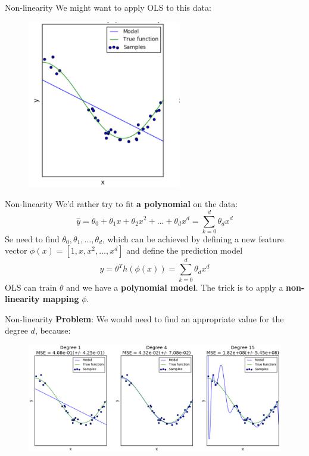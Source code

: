 \documentclass{beamer}
\newcommand{\1}[1]{\mathbbm{1}\left[#1\right]}
\newcommand{\yhat}{\hat{y}}
\begin{document}
\begin{frame}{Non-linearity}
We might want to apply OLS to this data:
\begin{figure}
\centering
\includegraphics[width=0.6\textwidth]{images/underfitting.png}
\end{figure}
\end{frame}

\begin{frame}{Non-linearity}
We'd rather try to fit \textbf{a polynomial} on the data:
\begin{equation*}
\yhat = \theta_0 + \theta_1 x + \theta_2 x^2 + \dots + \theta_d x^d = \sum_{k = 0}^d \theta_d x^d 
\end{equation*}
\pause
\vfill
Se need to find $\theta_0, \theta_1, \dots, \theta_d$, which can be achieved by defining a new feature vector $\phi(x) = [1, x, x^2, \dots, x^d]$ and define the prediction model
\begin{equation*}
\yhat = \theta^T h(\phi(x)) = \sum_{k = 0}^d \theta_d x^d 
\end{equation*}
\pause
\vfill
OLS can train $\theta$ and we have a \textbf{polynomial model}. The trick is to apply a \textbf{non-linearity mapping} $\phi$.
\end{frame}

\begin{frame}{Non-linearity}
\textbf{Problem}: We would need to find an appropriate value for the degree $d$, because:
\vfill
\begin{figure}
\centering
\includegraphics[width=\textwidth]{images/over_under_fitting.png}
\end{figure}
\end{frame}
\end{document}
